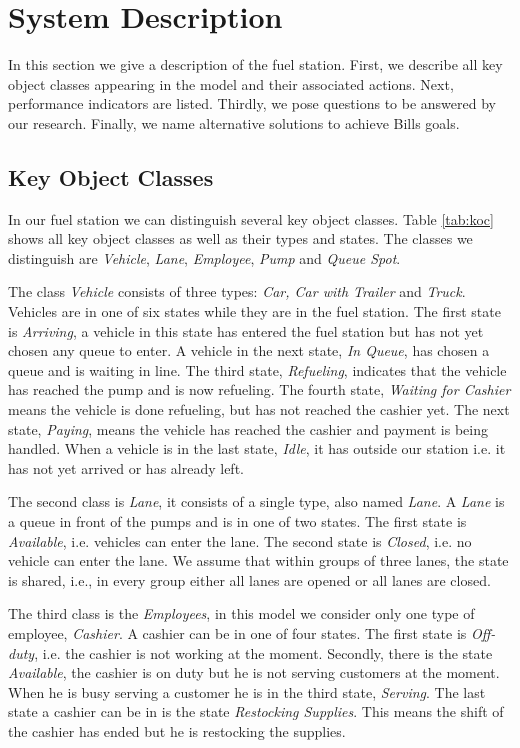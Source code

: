 \section{System Description}
In this section we give a description of the fuel station.
First, we describe all key object classes appearing in the model and their associated actions. 
Next, performance indicators are listed.
Thirdly, we pose questions to be answered by our research.
Finally, we name alternative solutions to achieve Bills goals.

\subsection{Key Object Classes}
In our fuel station we can distinguish several key object classes.
Table \ref{tab:koc} shows all key object classes as well as their types and states.
The classes we distinguish are \textit{Vehicle}, \textit{Lane}, \textit{Employee}, \textit{Pump} and \textit{Queue Spot}. 

The class \textit{Vehicle} consists of three types: \textit{Car, Car with Trailer} and \textit{Truck}.
 Vehicles are in one of six states while they are in the fuel station. 
 The first state is \textit{Arriving}, a vehicle in this state has entered the fuel station but has not yet chosen any queue to enter.
 A vehicle in the next state, \textit{In Queue}, has chosen a queue and is waiting in line. 
 The third state, \textit{Refueling}, indicates that the vehicle has reached the pump and is now refueling. 
 The fourth state, \textit{Waiting for Cashier} means the vehicle is done refueling, but has not reached the cashier yet. 
 The next state, \textit{Paying}, means the vehicle has reached the cashier and payment is being handled. 
 When a vehicle is in the last state, \textit{Idle}, it has outside our station i.e. it has not yet arrived or has already left.
 
The second class is \textit{Lane}, it consists of a single type, also named \textit{Lane}.
A \textit{Lane} is a queue in front of the pumps and is in one of two states. 
The first state is \textit{Available}, i.e. vehicles can enter the lane.
The second state is \textit{Closed}, i.e. no vehicle can enter the lane.
We assume that within groups of three lanes, the state is shared, i.e., in every group either all lanes are opened or all lanes are closed.

The third class is the \textit{Employees}, in this model we consider only one type of employee, \textit{Cashier}. 
A cashier can be in one of four states.
The first state is \textit{Off-duty}, i.e. the cashier is not working at the moment. 
Secondly, there is the state \textit{Available}, the cashier is on duty but he is not serving customers at the moment. 
When he is busy serving a customer he is in the third state, \textit{Serving}.
The last state a cashier can be in is the state \textit{Restocking Supplies}. 
This means the shift of the cashier has ended but he is restocking the supplies.

